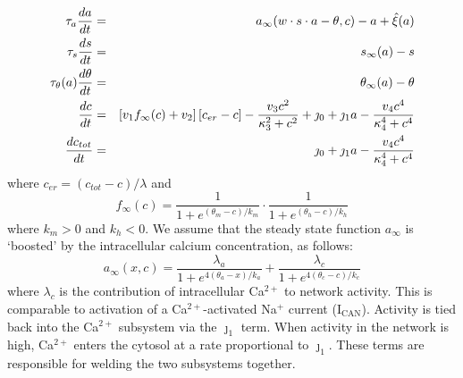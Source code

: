 \documentclass[12pt]{article}
\def\ca{Ca$^{2+}$\xspace}
\def\w{w}
\def\taus{\tau_s}
\def\thetaa{\theta_a}
\def\ka{k_a}
\def\ainf{a_\infty}
\def\sinf{s_\infty}
\def\thetac{\theta_c}
\def\kc{k_c}
\def\thetainf{\theta_\infty}
\def\tautheta{\tau_\theta}
\def\ctot{c_{tot}}
\def\cer{c_{er}}
\def\finf{f_\infty}
\def\thetam{\theta_m}
\def\km{k_m}
\def\thetah{\theta_h}
\def\kh{k_h}
\begin{document}
\begin{eqnarray*}
\tau_a \ddt{a} &=& \ainf (\w \cdot s \cdot a -\theta , c) - a + \hat{\xi}(a) \label{ODEACALCIUM} \\
\taus \ddt{s} &=& \sinf (a) - s  \label{ODESCALCIUM} \\
\tautheta(a) \ddt{\theta} &=& \thetainf (a) - \theta   \label{ODETHETACALCIUM}  \\
  \ddt{c} &=&  \left[ v_1 \finf(c) + v_2 \right] [\cer - c ] - \frac{v_3 c^2 }{\kappa_3^2 + c^2} + \jmath_0 + \jmath_1 a   -  \frac{v_4 c^4}{\kappa_4^4+c^4}  \label{ODESCALCIUM} \\
 \ddt{\ctot} &=& \jmath_0 + \jmath_1 a -   \frac{v_4 c^4}{\kappa_4^4+c^4}   \label{ODESCALCIUM}  \label{ODESCAER}
\end{eqnarray*}
where  $\cer = (\ctot-c)/\lambda$ and 
\begin{equation}
\finf(c) =  \frac{1}{1+e^{(\thetam-c)/\km}} \cdot  \frac{1}{1+e^{(\thetah-c)/\kh}}  \nonumber 
\end{equation}
where $\km>0$ and $\kh<0$.  We assume that the 
steady state function $\ainf$ is `boosted' by the intracellular calcium concentration, as follows:
\begin{equation}
\ainf(x,c) = \frac{\lambda_a }{1+e^{4(\thetaa-x)/\ka}}  + \frac{\lambda_c }{1+e^{4(\thetac-c)/\kc}}  
 \nonumber 
\end{equation}
where $\lambda_c$ is the contribution of intracellular \ca to network activity. This is comparable to activation of a \ca-activated Na$^+$ current (I$_{\text{CAN}}$). Activity is tied back into the \ca subsystem via the $\jmath_1$ term. When activity in the network is high, \ca enters the cytosol at a rate proportional to $\jmath_1$. These terms are responsible for welding the two subsystems together. 
\end{document}
